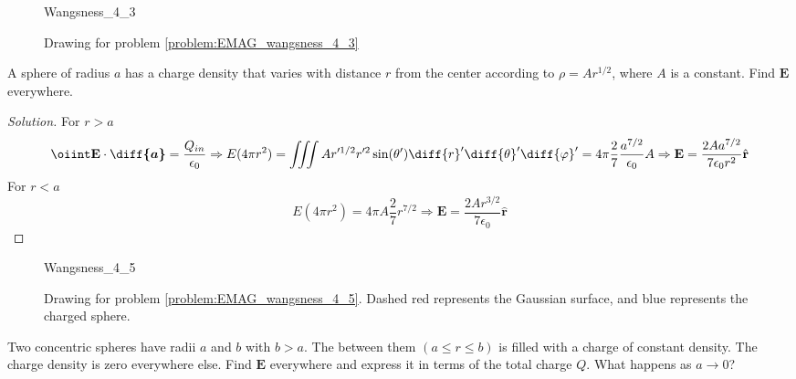 \documentclass[crop=false,class=article,oneside]{standalone}
\begin{document}
    \begin{figure}
        \centering
        \captionsetup{type=figure}
        {Wangsness_4_3}
        \caption[Drawing for Wangsness 4-3]
        {Drawing for problem \ref{problem:EMAG_wangsness_4_3}}
        \label{fig:EMAG_1_Wangsness_4_3}
    \end{figure}
    \begin{problem}[Wangsness 4-5]
        \label{problem:EMAG_wangsness_4_5}
        A sphere of radius $a$ has a charge density that varies
        with distance $r$ from the center according to
        $\rho=Ar^{1/2}$, where $A$ is a constant.
        Find $\mathbf{E}$ everywhere.
    \end{problem}
    \begin{proof}[Solution]
        For $r>a$
        \begin{equation*}
            \oiint\mathbf{E}\cdot\boldsymbol{\diff{a}}
            =\frac{Q_{in}}{\epsilon_{0}}\Rightarrow
            E(4\pi r^{2})
            =\iiint{A}r'^{1/2}r'^{2}
            \sin(\theta')\diff{r}'\diff{\theta}'\diff{\varphi}'
            =4\pi\frac{2}{7}\frac{a^{7/2}}{\epsilon_{0}}A
            \Rightarrow\mathbf{E}
            =\frac{2Aa^{7/2}}{7\epsilon_{0}r^{2}}\hat{\mathbf{r}}
        \end{equation*}
        For $r<a$
        \begin{equation*}
            E(4\pi r^{2})
            =4\pi A\frac{2}{7}r^{7/2}\Rightarrow
            \mathbf{E}
            =\frac{2Ar^{3/2}}{7\epsilon_{0}}\hat{\mathbf{r}}
        \end{equation*}
    \end{proof}
    \begin{figure}[H]
        \centering
        \captionsetup{type=figure}
        {Wangsness_4_5}
        \caption[Drawing for Wangsness 4-3]{%
            Drawing for problem \ref{problem:EMAG_wangsness_4_5}.
            Dashed red represents the Gaussian surface,
            and blue represents the charged sphere.
        }
        \label{fig:EMAG_1_Wangsness_4_5}
    \end{figure}
    \begin{problem}[Wangsness 4-6]
        Two concentric spheres have radii $a$ and $b$ with $b>a$.
        The between them $(a\leq{r}\leq{b})$ is filled with a
        charge of constant density. The charge density is zero
        everywhere else. Find $\mathbf{E}$ everywhere and express
        it in terms of the total charge $Q$.
        What happens as $a\rightarrow{0}$?
    \end{problem}
\end{document}
